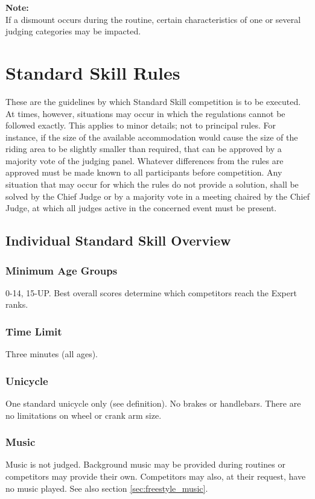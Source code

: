 \textbf{Note:} \\
If a dismount occurs during the routine, certain characteristics of one or several judging categories may be impacted. 

\chapter{Standard Skill Rules \label{chap:freestyle_std-skill-rules}}

These are the guidelines by which Standard Skill competition is to be executed.
At times, however, situations may occur in which the regulations cannot be followed exactly.
This applies to minor details; not to principal rules.
For instance, if the size of the available accommodation would cause the size of the riding area to be slightly smaller than required, that can be approved by a majority vote of the judging panel.
Whatever differences from the rules are approved must be made known to all participants before competition.
Any situation that may occur for which the rules do not provide a solution, shall be solved by the Chief Judge or by a majority vote in a meeting chaired by the Chief Judge, at which all judges active in the concerned event must be present.

\section{Individual Standard Skill Overview}

\subsection{Minimum Age Groups}
0-14, 15-UP.
Best overall scores determine which competitors reach the Expert ranks.

\subsection{Time Limit}
Three minutes (all ages).

\subsection{Unicycle}
One standard unicycle only (see definition).
No brakes or handlebars.
There are no limitations on wheel or crank arm size.

\subsection{Music}
Music is not judged.
Background music may be provided during routines or competitors may provide their own.
Competitors may also, at their request, have no music played.
See also section \ref{sec:freestyle_music}.

